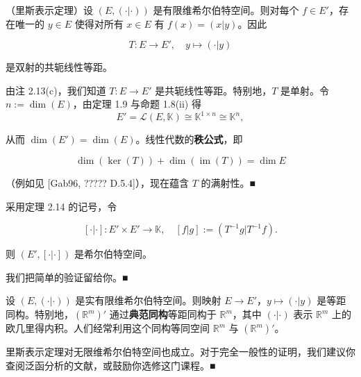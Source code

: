 \begin{theorem}

（里斯表示定理）设 $ (E, (\cdot|\cdot)) $ 是有限维希尔伯特空间。则对每个 $ f \in E' $，存在唯一的 $ y \in E $ 使得对所有 $ x \in E $ 有 $ f(x) = (x|y) $。因此

\[
T : E \to E' , \quad y \mapsto (\cdot|y)
\]

是双射的共轭线性等距。

\proofhead
由注 2.13(c)，我们知道 $ T : E \to E' $ 是共轭线性等距。特别地，$ T $ 是单射。令 $ n := \dim(E) $，由定理 1.9 与命题 1.8(ii) 得
\[
E' = \mathcal{L}(E, \mathbb{K}) \cong \mathbb{K}^{1 \times n} \cong \mathbb{K}^n ,
\]

从而 $ \dim(E') = \dim(E) $。线性代数的\textbf{秩公式}，即

\begin{equation}
\dim(\ker(T)) + \dim(\operatorname{im}(T)) = \dim E\tag{2.4}
\end{equation}

（例如见 [Gab96, ????? D.5.4]），现在蕴含 $ T $ 的满射性。\nobreak\hspace{0.35em}■

\end{theorem}

\begin{remark}

\begin{items}
\item

采用定理 2.14 的记号，令

\[
[\cdot|\cdot] : E' \times E' \to \mathbb{K} , \quad [f|g] := (T^{-1}g | T^{-1}f) .
\]

则 $ (E', [\cdot|\cdot]) $ 是希尔伯特空间。

\proofhead
我们把简单的验证留给你。\nobreak\hspace{0.35em}■
\item

设 $ (E, (\cdot|\cdot)) $ 是实有限维希尔伯特空间。则映射 $ E \to E' $，$ y \mapsto (\cdot|y) $ 是等距同构。特别地，$ (\mathbb{R}^m)' $ 通过\textbf{典范同构}等距同构于 $ \mathbb{R}^m $，其中 $ (\cdot|\cdot) $ 表示 $ \mathbb{R}^m $ 上的欧几里得内积。人们经常利用这个同构等同空间 $ \mathbb{R}^m $ 与 $ (\mathbb{R}^m)' $。

\item

里斯表示定理对无限维希尔伯特空间也成立。对于完全一般性的证明，我们建议你查阅泛函分析的文献，或鼓励你选修这门课程。\nobreak\hspace{0.35em}■

\end{items}

\end{remark}

